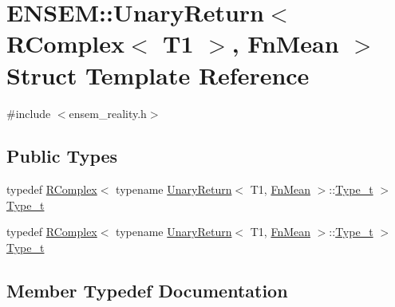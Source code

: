 \hypertarget{structENSEM_1_1UnaryReturn_3_01RComplex_3_01T1_01_4_00_01FnMean_01_4}{}\section{E\+N\+S\+EM\+:\+:Unary\+Return$<$ R\+Complex$<$ T1 $>$, Fn\+Mean $>$ Struct Template Reference}
\label{structENSEM_1_1UnaryReturn_3_01RComplex_3_01T1_01_4_00_01FnMean_01_4}


{\ttfamily \#include $<$ensem\+\_\+reality.\+h$>$}

\subsection*{Public Types}
\begin{DoxyCompactItemize}
\item 
typedef \mbox{\hyperlink{classENSEM_1_1RComplex}{R\+Complex}}$<$ typename \mbox{\hyperlink{structENSEM_1_1UnaryReturn}{Unary\+Return}}$<$ T1, \mbox{\hyperlink{structENSEM_1_1FnMean}{Fn\+Mean}} $>$\+::\mbox{\hyperlink{structENSEM_1_1UnaryReturn_3_01RComplex_3_01T1_01_4_00_01FnMean_01_4_a36f90d415b22308c1707a2639a538763}{Type\+\_\+t}} $>$ \mbox{\hyperlink{structENSEM_1_1UnaryReturn_3_01RComplex_3_01T1_01_4_00_01FnMean_01_4_a36f90d415b22308c1707a2639a538763}{Type\+\_\+t}}
\item 
typedef \mbox{\hyperlink{classENSEM_1_1RComplex}{R\+Complex}}$<$ typename \mbox{\hyperlink{structENSEM_1_1UnaryReturn}{Unary\+Return}}$<$ T1, \mbox{\hyperlink{structENSEM_1_1FnMean}{Fn\+Mean}} $>$\+::\mbox{\hyperlink{structENSEM_1_1UnaryReturn_3_01RComplex_3_01T1_01_4_00_01FnMean_01_4_a36f90d415b22308c1707a2639a538763}{Type\+\_\+t}} $>$ \mbox{\hyperlink{structENSEM_1_1UnaryReturn_3_01RComplex_3_01T1_01_4_00_01FnMean_01_4_a36f90d415b22308c1707a2639a538763}{Type\+\_\+t}}
\end{DoxyCompactItemize}


\subsection{Member Typedef Documentation}
\mbox{\label{structENSEM_1_1UnaryReturn_3_01RComplex_3_01T1_01_4_00_01FnMean_01_4_a36f90d415b22308c1707a2639a538763}} 
